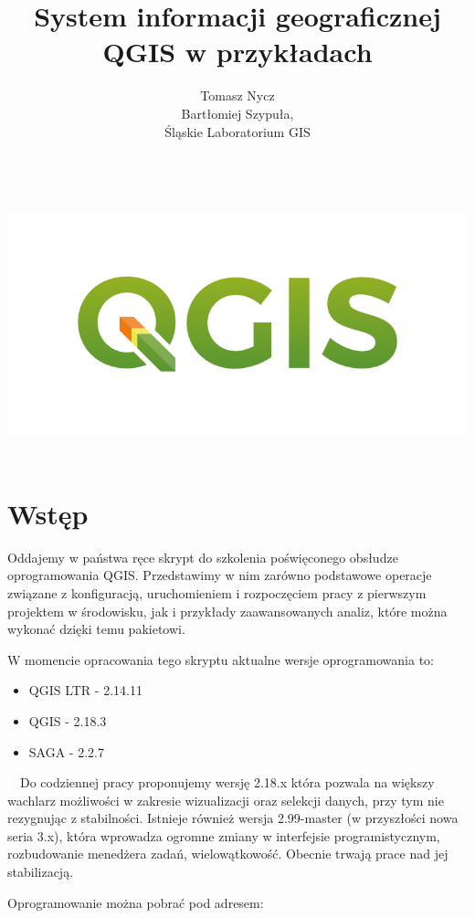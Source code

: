 \documentclass[12pt,a4paper]{book}
\begin{document}
\frontmatter
\title{System informacji geograficznej QGIS w przykładach}
\author{Tomasz Nycz \\Bartłomiej Szypuła, \\Śląskie Laboratorium GIS}
\date{}
\maketitle
\includegraphics[width=15.949cm,height=7.645cm]{logo-qgis3}

\chapter{Wstęp}
Oddajemy w państwa ręce skrypt do szkolenia poświęconego obsłudze oprogramowania QGIS. Przedstawimy w nim zarówno podstawowe operacje związane z konfiguracją, uruchomieniem i rozpoczęciem pracy z pierwszym projektem w środowisku, jak i przykłady zaawansowanych analiz, które można wykonać dzięki temu pakietowi.

W momencie opracowania tego skryptu aktualne wersje oprogramowania to:
\begin{itemize}
\item QGIS LTR - 2.14.11
\item QGIS - 2.18.3
\item SAGA - 2.2.7
\end{itemize}
\ \ Do codziennej pracy proponujemy wersję 2.18.x która pozwala na większy wachlarz możliwości w zakresie wizualizacji oraz selekcji danych, przy tym nie rezygnując z stabilności. Istnieje również wersja 2.99-master (w przyszłości nowa seria 3.x), która wprowadza ogromne zmiany w interfejsie programistycznym, rozbudowanie menedżera zadań, wielowątkowość. Obecnie trwają prace nad jej stabilizacją.

Oprogramowanie można pobrać pod adresem:
\end{document}
